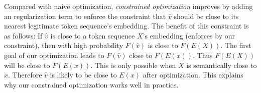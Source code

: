 Compared with naive optimization, \textit{constrained optimization} improves by adding an regularization term to enforce the constraint that $\hat{v}$ should be close to its nearest legitimate token sequence's embedding. 
The benefit of this constraint is as follows: If $\hat{v}$ is close to  a token sequence $X$'s embedding (enforces by our constraint), then with high probability $F(\hat{v})$ is close to $F(E(X))$.  The first goal of our optimization leads to $F(\hat{v})$ close to $F(E(x))$. Thus $F(E(X))$ will be close to $F(E(x))$. This is only possible when $X$ is semantically close to $x$. Therefore $\hat{v}$ is likely to be close to $E(x)$ after optimization. 
This explains why our constrained optimization works well in practice. 






